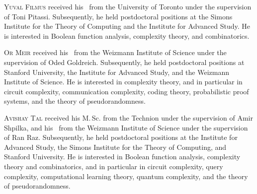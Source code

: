 \documentclass{toc}
\begin{document}
%
%
%
%
%
%
%
%
%
%
%
%
%
%
%
%
%
%
%
%
\begin{tocaboutauthors}
\begin{tocabout}[filmus] 
\textsc{Yuval Filmus} received his \phd\ from the University of Toronto under the supervision of Toni Pitassi. Subsequently, he held postdoctoral positions at the Simons Institute for the Theory of Computing and the Institute for Advanced Study.
He is interested in Boolean function analysis, complexity theory, and combinatorics.
\end{tocabout}
\begin{tocabout}[meir]
\textsc{Or Meir} received his \phd\ from the Weizmann Institute 
%
of  %
Science under the supervision of Oded Goldreich. Subsequently, he held postdoctoral positions at Stanford University, the Institute %
for  %
Advanced Study, and the Weizmann Institute %
of  %
Science.
He is interested in complexity theory, and in particular in circuit complexity, communication complexity, coding theory, probabilistic proof systems, and the theory of pseudorandomness.
\end{tocabout}
\begin{tocabout}[tal]
\textsc{Avishay Tal} received his M.\,Sc. from the Technion under the supervision of Amir Shpilka, and his \phd\ from the Weizmann Institute of Science under the supervision of Ran Raz. Subsequently, he held postdoctoral positions at the Institute for Advanced Study, the Simons Institute for the Theory of Computing, and Stanford University.
He is interested in Boolean function analysis, complexity theory and combinatorics, and in particular in circuit complexity, query complexity, computational learning theory, quantum complexity, and the theory of pseudorandomness.
\end{tocabout}

\end{tocaboutauthors}
\end{document}
